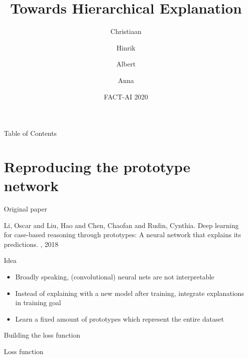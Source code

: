 \documentclass{beamer}[169]
\title{Towards Hierarchical Explanation}
\author{Christiaan \and Hinrik \and Albert \and Anna}
\date{FACT-AI 2020}
\begin{document}
\frame{\titlepage}



\begin{frame}{Table of Contents}
\tableofcontents
\end{frame}



\section{Reproducing the prototype network}
\begin{frame}{Original paper}
    \begin{thebibliography}{99}
        Li, Oscar and Liu, Hao and Chen, Chaofan and Rudin, Cynthia.
        \newblock Deep learning for case-based reasoning through prototypes: A neural network that explains its predictions.
        , 2018
    \end{thebibliography}
\end{frame}

\begin{frame}{Idea}
\begin{itemize}
    \item Broadly speaking, (convolutional) neural nets are not interpretable
    \item Instead of explaining with a new model after training, integrate explanations in training goal
    \item Learn a fixed amount of \alert{prototypes} which represent the entire dataset
\end{itemize}
\end{frame}

\begin{frame}{Building the loss function}
\begin{block}{Loss function}
\end{block}
\end{frame}
\end{document}
